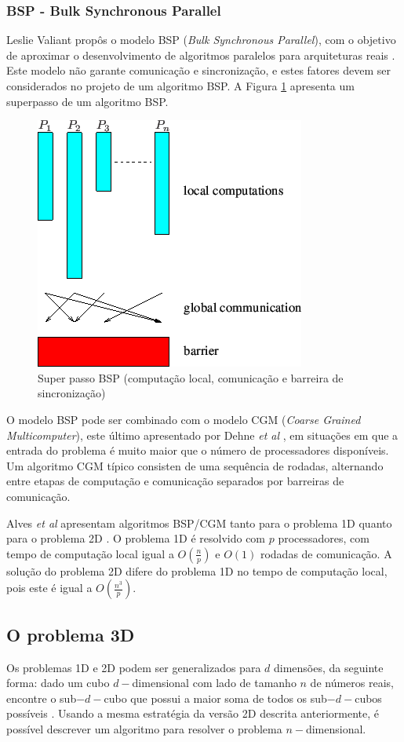 \documentclass[a4paper, 12pt] {article}
\begin{document}
\subsubsection{BSP - Bulk Synchronous Parallel}

Leslie Valiant propôs o modelo BSP (\textit{Bulk Synchronous
Parallel}), com o objetivo de aproximar o
desenvolvimento de algoritmos paralelos para
arquiteturas reais \cite{Valiant:1990:BMP:79173.79181}. Este modelo não garante
comunicação e sincronização, e estes fatores devem ser considerados no projeto
de um algoritmo BSP. A Figura \ref{fig:bsp} apresenta um superpasso de um
algoritmo BSP.

\begin{figure}[ht]
\centering
\includegraphics[width=.35\textwidth]{bsp.png}
\caption{Super passo BSP (computação local, comunicação e barreira de
sincronização)}
\label{fig:bsp}
\end{figure}

O modelo BSP pode ser combinado com o modelo CGM (\textit{Coarse Grained
Multicomputer}), este último apresentado por Dehne \textit{et al}
\cite{Dehne:1993:SPG:160985.161154}, em situações em que a entrada do problema é
muito maior que o número de processadores disponíveis. Um algoritmo CGM típico
consisten de uma sequência de rodadas, alternando entre etapas de computação e
comunicação separados por barreiras de comunicação.

Alves \textit{et al} apresentam algoritmos BSP/CGM tanto para o problema 1D
quanto para o problema 2D \cite{alves2004}. O problema 1D é resolvido com $p$
processadores, com tempo de computação local igual a  $O(\frac{n}{p})$ e $O(1)$
rodadas de comunicação. A solução do problema 2D difere do problema 1D no tempo
de computação local, pois este é igual a $O(\frac{n^3}{p})$.

\subsection{O problema 3D}

Os problemas 1D e 2D podem ser generalizados para $d$ dimensões, da seguinte
forma: dado um cubo $d-$dimensional com lado de tamanho $n$ de números reais,
encontre o sub$-d-$cubo que possui a maior soma de todos os sub$-d-$cubos
possíveis \cite{journals/ppl/PerumallaD95}. Usando a mesma estratégia da versão
2D descrita anteriormente, é possível descrever um algoritmo para resolver o
problema $n-$dimensional.
\end{document}
